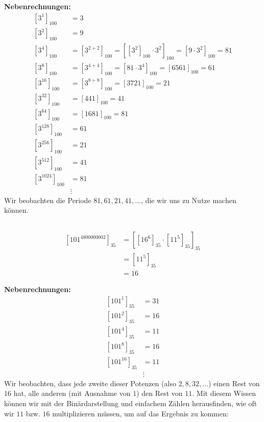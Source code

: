 \documentclass{../crypto}
\begin{document}
\textbf{Nebenrechnungen:}
\begin{align*}
  \left[3^{1}\right]_{100} &= 3 \\
  \left[3^{2}\right]_{100} &= 9 \\
  \left[3^{4}\right]_{100} &= \left[3^{2+2}\right]_{100} 
                            = \left[\left[3^{2}\right]_{100} \cdot 3^{2}\right]_{100} 
                            = \left[9 \cdot 3^{2}\right]_{100} = 81 \\
  \left[3^{8}\right]_{100} &= \left[3^{4+4}\right]_{100}
                            = \left[81 \cdot 3^{4}\right]_{100} 
                            = \left[6561\right]_{100} = 61 \\
  \left[3^{16}\right]_{100} &= \left[3^{8+8}\right]_{100}
                             = \left[3721\right]_{100} = 21 \\
  \left[3^{32}\right]_{100} &= \left[441\right]_{100} = 41 \\
  \left[3^{64}\right]_{100} &= \left[1681\right]_{100} = 81 \\
  \left[3^{128}\right]_{100} &= 61 \\
  \left[3^{256}\right]_{100} &= 21 \\
  \left[3^{512}\right]_{100} &= 41 \\
  \left[3^{1024}\right]_{100} &= 81 \\
                              &\vdots
\end{align*}
Wir beobachten die Periode $81, 61, 21, 41, \dots$, die wir uns zu Nutze machen können.

\subsection{}
\begin{align*}
  \left[101^{4800000002}\right]_{35} &= \left[ \left[16^6\right]_{35} 
                                         \cdot \left[11^5\right]_{35}
                                        \right]_{35} \\
                                     &= \left[11^5\right]_{35} \\
                                     &= 16
\end{align*}

\textbf{Nebenrechnungen:}
\begin{align*}
  \left[101^{1}\right]_{35} &= 31 \\
  \left[101^{2}\right]_{35} &= 16 \\
  \left[101^{4}\right]_{35} &= 11 \\
  \left[101^{8}\right]_{35} &= 16 \\
  \left[101^{16}\right]_{35} &= 11 \\
                             &\vdots
\end{align*}
Wir beobachten, dass jede zweite dieser Potenzen (also $2, 8, 32, \dots$) einen
Rest von $16$ hat, alle anderen (mit Ausnahme von $1$) den Rest von $11$.
Mit diesem Wissen können wir mit der Binärdarstellung und einfachem Zählen
herausfinden, wie oft wir $11$ bzw. $16$ multiplizieren müssen, um auf das 
Ergebnis zu kommen:
\end{document}
